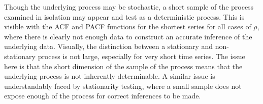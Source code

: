 Though the underlying process may be stochastic, a short sample of the process examined in isolation may appear and test as a deterministic process. This is visible with the ACF and PACF functions for the shortest series for all cases of $\rho$, where there is clearly not enough data to construct an accurate inference of the underlying data. Visually, the distinction between a stationary and non-stationary process is not large, especially for very short time series. The issue here is that the short dimension of the sample of the process means that the underlying process is not inherently determinable. A similar issue is understandably faced by stationarity testing, where a small sample does not expose enough of the process for correct inferences to be made.
